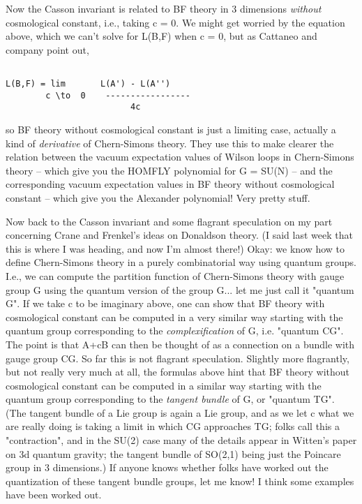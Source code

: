 Now the Casson invariant is related to BF theory in 3 dimensions 
\emph{without} cosmological constant, i.e., taking c = 0.  We might
get worried by the equation above, which we can't solve
for L(B,F) when c = 0, but as Cattaneo and company point out,


\begin{verbatim}

L(B,F) = lim       L(A') - L(A'')
        c \to  0    -----------------
                         4c
\end{verbatim}
    

so BF theory without cosmological constant is just a limiting
case, actually a kind of \emph{derivative} of Chern-Simons theory.
They use this to make clearer the relation between the vacuum
expectation values of Wilson loops in Chern-Simons theory --
which give you the HOMFLY polynomial for G = SU(N) -- and
the corresponding vacuum expectation values in BF theory without
cosmological constant -- which give you the Alexander polynomial!
Very pretty stuff.

Now back to the Casson invariant and some flagrant speculation
on my part concerning Crane and Frenkel's ideas on Donaldson theory.
(I said last week that this is where I was heading, and now I'm
almost there!)  Okay: we know how to define Chern-Simons theory
in a purely combinatorial way using quantum groups.  I.e., we
can compute the partition function of Chern-Simons theory with
gauge group G using the quantum version of the group G... let
me just call it "quantum G".  If we take c to be imaginary above, 
one can show that BF theory with cosmological constant can be
computed in a very similar way starting with the quantum group
corresponding to the \emph{complexification} of G, i.e. 
"quantum CG".
The point is that A+cB can then be thought of as a connection on 
a bundle with gauge group CG.  So far this is not flagrant
speculation.  Slightly more flagrantly, but not really very much at 
all, the formulas above hint that BF theory without cosmological
constant can be computed in a similar way starting with the
quantum group corresponding to the \emph{tangent bundle} of G, or
"quantum TG".  (The tangent bundle of a Lie group is again
a Lie group, and as we let c  what we are really doing is
taking a limit in which CG approaches TG; folks call this a
"contraction", and in the SU(2) case many of the details appear
in Witten's paper on 3d quantum gravity; the tangent bundle
of SO(2,1) being just the Poincare group in 3 dimensions.)  If
anyone knows whether folks have worked out the quantization of
these tangent bundle groups, let me know!  I think some examples
have been worked out.

